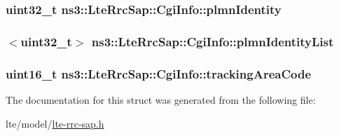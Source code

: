 \subsubsection[{\texorpdfstring{plmn\+Identity}{plmnIdentity}}]{\setlength{\rightskip}{0pt plus 5cm}uint32\+\_\+t ns3\+::\+Lte\+Rrc\+Sap\+::\+Cgi\+Info\+::plmn\+Identity}\hypertarget{structns3_1_1LteRrcSap_1_1CgiInfo_a729f074bcc31dda7c48e09055393d10d}{}\label{structns3_1_1LteRrcSap_1_1CgiInfo_a729f074bcc31dda7c48e09055393d10d}
\subsubsection[{\texorpdfstring{plmn\+Identity\+List}{plmnIdentityList}}]{$<$uint32\+\_\+t$>$ ns3\+::\+Lte\+Rrc\+Sap\+::\+Cgi\+Info\+::plmn\+Identity\+List}\hypertarget{structns3_1_1LteRrcSap_1_1CgiInfo_a8f6fc9d4cee9d73557e4ed389e5f89ad}{}\label{structns3_1_1LteRrcSap_1_1CgiInfo_a8f6fc9d4cee9d73557e4ed389e5f89ad}
\subsubsection[{\texorpdfstring{tracking\+Area\+Code}{trackingAreaCode}}]{\setlength{\rightskip}{0pt plus 5cm}uint16\+\_\+t ns3\+::\+Lte\+Rrc\+Sap\+::\+Cgi\+Info\+::tracking\+Area\+Code}\hypertarget{structns3_1_1LteRrcSap_1_1CgiInfo_ab6037522e5ef68de7132f0f5732cc190}{}\label{structns3_1_1LteRrcSap_1_1CgiInfo_ab6037522e5ef68de7132f0f5732cc190}


The documentation for this struct was generated from the following file\+:\begin{DoxyCompactItemize}
\item 
lte/model/\hyperlink{lte-rrc-sap_8h}{lte-\/rrc-\/sap.\+h}\end{DoxyCompactItemize}

